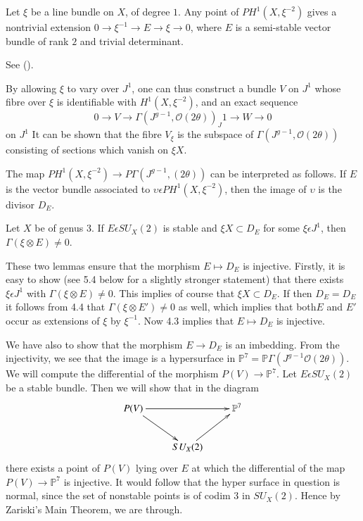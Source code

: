 \begin{lemma}\label{lemma4.2}
Let $\xi$ be a line bundle on $X$, of degree $1$. Any point of
$PH^{1}\left(X,\xi^{-2}\right)$ gives a nontrivial extension $0\to
\xi^{-1}\to E\to \xi \to 0$, where $E$ is a semi-stable vector bundle
of rank $2$ and trivial determinant. 
\end{lemma}

\begin{Proof}
See (\cite[Lemma~\ref{lemma5.1}]{key5}).

By allowing $\xi$ to vary over $J^{1}$, one can thus construct a bundle
$V$ on $J^{1}$ whose fibre over $\xi$ is identifiable with
$H^{1}\left(X,\xi^{-2}\right)$, and an exact sequence 
$$
0\to V\to \Gamma (J^{g-1},\mathscr{O}(2\theta))_J1\to W\to 0
$$
on $J^{1}$ It can be shown that the fibre $V_{\xi}$ is the subspace of
$\Gamma(J^{g-1},\mathscr{O}(2\theta))$ consisting of sections which
vanish on $\xi X$. 
\end{Proof}

\begin{lemma}\label{lemma4.3}
The map $PH^{1}\left(X,\xi^{-2}\right)\to P\Gamma(J^{g-1},(2\theta))$
can be interpreted as follows. If $E$ is the vector bundle associated
to $\upsilon \epsilon PH^{1}\left(X,\xi^{-2}\right)$, then the image of
$\upsilon$ is the divisor $D_E$. 
\end{lemma}

\begin{lemma}\label{lemma4.4}
Let $X$ be of genus $3$. If $E\epsilon SU_X(2)$ is stable and $\xi
X\subset D_E$ for some $\xi\epsilon J^{1}$, then $\Gamma(\xi\otimes
E)\neq 0$. 
\end{lemma}

These two lemmas ensure that the morphism $E\mapsto D_E$ is
injective. Firstly, it is easy to show (see 5.4 below for a slightly
stronger statement) that there exists $\xi \epsilon J^{1}$ with
$\Gamma(\xi \otimes E)\neq 0$. This implies of course that $\xi
X\subset D_E$. If then $D_E=D_E$ it follows from 4.4 that
$\Gamma(\xi\otimes E')\neq 0$ as well, which implies that both\pageoriginale $E$ and
$E'$ occur as extensions of $\xi$ by $\xi^{-1}$. Now 4.3 implies that
$E\mapsto D_E$ is injective.

We have also to show that the morphism $E\to D_E$ is an
imbedding. From the injectivity, we see that the image is a
hypersurface in $\mathbb{P}^{7}=\mathbb{P}\Gamma
\left(J^{g-1}\mathscr{O}(2\theta)\right)$. We will compute the differential
of the morphism $P(V)\to \mathbb{P}^{7}$. Let $E\epsilon SU_X(2)$ be a
stable bundle. Then we will show that in the diagram 
$$
\xymatrix{P(V)\ar[dr]\ar[rr]&&\mathbb{P}^{7}\\
&SU_{X}(2)\ar[ur]&}
$$
there exists a point of $P(V)$ lying over $E$ at which the
differential of the map $P(V)\to \mathbb{P}^{7}$ is injective. It
would follow that the hyper surface in question is normal, since the
set of nonstable points is of codim $3$ in $SU_X(2)$. Hence by
Zariski's Main Theorem, we are through. 

